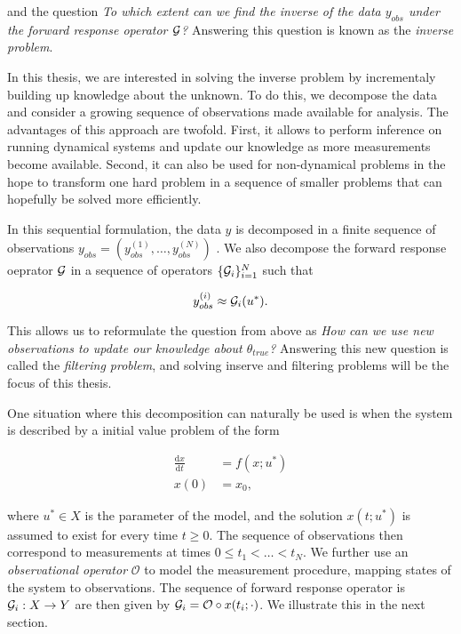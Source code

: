 and the question \textit{To which extent can we find the \textit{inverse} of the data $y_{obs}$ under the forward response operator $\mathcal{G}$?} Answering this question is known as the \textit{inverse problem}.

In this thesis, we are interested in solving the inverse problem by incrementaly building up knowledge about the unknown. To do this, we decompose the data and consider a growing sequence of observations made available for analysis. The advantages of this approach are twofold. First, it allows to perform inference on running dynamical systems and update our knowledge as more measurements become available. Second, it can also be used for non-dynamical problems in the hope to transform one hard problem in a sequence of smaller problems that can hopefully be solved more efficiently.

In this sequential formulation, the data $y$ is decomposed in a finite sequence of observations $y_{obs} = (y_{obs}^{(1)}, \ldots, y_{obs}^{(N)})$ . We also decompose the forward response oeprator $\mathcal{G}$ in a sequence of operators $\{\mathcal{G}_i\}_{i=1}^N$ such that

\begin{equation*}
  y_{obs}^{(i)}\approx \mathcal{G}_i(u^*).
\end{equation*}


This allows us to reformulate the question from above as \textit{How can we use new observations to update our knowledge about $\theta_{true}$?} Answering this new question is called the \textit{filtering problem}, and solving inserve and filtering problems will be the focus of this thesis.

One situation where this decomposition can naturally be used is when the system is described by a initial value problem of the form

\begin{equation}
  \begin{aligned}
    \frac{\text{d}x}{\text{d}t} &= f(x; u^*)\\
    x(0) &= x_0,
  \end{aligned}
\end{equation}  

where $u^* \in X$ is the parameter of the model, and the solution $x(t; u^*)$ is assumed to exist for every time $t \geq 0$. The sequence of observations then correspond to measurements at times  $0 \leq t_1 < \ldots < t_N$. We further use an \textit{observational operator} $\mathcal{O}$ to model the measurement procedure, mapping states of the system to observations. The sequence of forward response operator is $\mathcal{G}_i : X \rightarrow Y$ are then given by $\mathcal{G}_i = \mathcal{O} \circ x(t_i; \cdot)$. We illustrate this in the next section.

